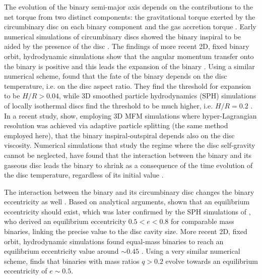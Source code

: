\documentclass{aa}
\begin{document}
The evolution of the binary semi-major axis depends on the contributions to the net torque from two distinct components: the gravitational torque exerted by the circumbinary disc on each binary component and the gas accretion torque \citep[see][for the detailed computation of the two contributions]{roedig2011}. 
Early numerical simulations of circumbinary discs showed the binary inspiral to be aided by the presence of the disc \citep{artymowicz1994,artymowicz1996,ArmitageNatarajan2002}.
The findings of more recent 2D, fixed binary orbit, hydrodynamic simulations show that the angular momentum transfer onto the binary is positive and this leads the expansion of the binary \citep{Munoz2019, Duffell2019, Munoz2020, Moody2019}. Using a similar numerical scheme, \cite{Tiede2020} found that the fate of the binary depends on the disc temperature, i.e. on the disc aspect ratio. They find the threshold for expansion to be $H/R>0.04$, while 3D smoothed particle hydrodynamics (SPH) simulations of locally isothermal discs find the threshold to be much higher, i.e. $H/R=0.2$ \cite{HeathNixon2020}. 
In a recent study, \cite{Franchini2022} show, employing 3D MFM simulations where hyper-Lagrangian resolution was achieved via adaptive particle splitting (the same method employed here), that the binary inspiral-outspiral depends also on the disc viscosity.
Numerical simulations that study the regime where the disc self-gravity cannot be neglected, have found that the interaction between the binary and its gaseous disc leads the binary to shrink as a consequence of the time evolution of the disc temperature, regardless of its initial value \citep{Cuadra2009, roedig2012, Franchini2021}.

The interaction between the binary and its circumbinary disc changes the binary eccentricity as well \citep{goldreich1980}. Based on analytical arguments, \cite{Artymowicz1991} shown that an equilibrium eccentricity should exist, which was later confirmed by the SPH simulations of \cite{roedig2011}, who derived an equilibrium eccentricity $0.5<e<0.8$ for comparable mass binaries, linking the precise value to the disc cavity size.
More recent 2D, fixed orbit, hydrodynamic simulations found equal-mass binaries to reach an equilibrium eccentricity value around $\sim 0.45$ \citep{Zrake2021,DOrazio2021}. Using a very similar numerical scheme, \cite{Siwek2023} finds that binaries with mass ratios $q>0.2$ evolve towards an equilibrium eccentricity of $e\sim 0.5$.
\end{document}
